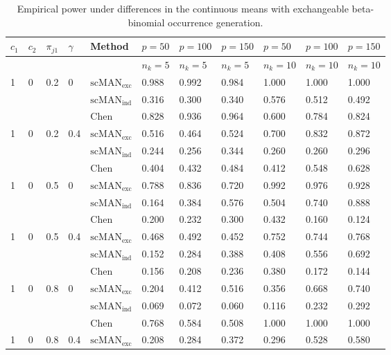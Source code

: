 \begin{table}[H]
\scriptsize
\centering
\caption{Empirical power under differences in the continuous means with exchangeable beta-binomial occurrence generation.}
\label{tab:mean-power-exchangeable}
\begin{tabular}{lllllllllll}
\hline
$c_1$ & $c_2$ & $\pi_{j1}$ & $\gamma$ & Method & $p=50$ & $p=100$ & $p=150$ & $p=50$ & $p=100$ & $p=150$ \\
\hline
& & & & & $n_k=5$ & $n_k=5$ & $n_k=5$ & $n_k=10$ & $n_k=10$ & $n_k=10$ \\
1 & 0 & 0.2 & 0 & $\mathrm{scMAN}_{\mathrm{exc}}$ & 0.988 & 0.992 & 0.984 & 1.000 & 1.000 & 1.000 \\
 &  &  &  & $\mathrm{scMAN}_{\mathrm{ind}}$ & 0.316 & 0.300 & 0.340 & 0.576 & 0.512 & 0.492 \\
 &  &  &  & Chen & 0.828 & 0.936 & 0.964 & 0.600 & 0.784 & 0.824 \\
1 & 0 & 0.2 & 0.4 & $\mathrm{scMAN}_{\mathrm{exc}}$ & 0.516 & 0.464 & 0.524 & 0.700 & 0.832 & 0.872 \\
 &  &  &  & $\mathrm{scMAN}_{\mathrm{ind}}$ & 0.244 & 0.256 & 0.344 & 0.260 & 0.260 & 0.296 \\
 &  &  &  & Chen & 0.404 & 0.432 & 0.484 & 0.412 & 0.548 & 0.628 \\
1 & 0 & 0.5 & 0 & $\mathrm{scMAN}_{\mathrm{exc}}$ & 0.788 & 0.836 & 0.720 & 0.992 & 0.976 & 0.928 \\
 &  &  &  & $\mathrm{scMAN}_{\mathrm{ind}}$ & 0.164 & 0.384 & 0.576 & 0.504 & 0.740 & 0.888 \\
 &  &  &  & Chen & 0.200 & 0.232 & 0.300 & 0.432 & 0.160 & 0.124 \\
1 & 0 & 0.5 & 0.4 & $\mathrm{scMAN}_{\mathrm{exc}}$ & 0.468 & 0.492 & 0.452 & 0.752 & 0.744 & 0.768 \\
 &  &  &  & $\mathrm{scMAN}_{\mathrm{ind}}$ & 0.152 & 0.284 & 0.388 & 0.408 & 0.556 & 0.692 \\
 &  &  &  & Chen & 0.156 & 0.208 & 0.236 & 0.380 & 0.172 & 0.144 \\
1 & 0 & 0.8 & 0 & $\mathrm{scMAN}_{\mathrm{exc}}$ & 0.204 & 0.412 & 0.516 & 0.356 & 0.668 & 0.740 \\
 &  &  &  & $\mathrm{scMAN}_{\mathrm{ind}}$ & 0.069 & 0.072 & 0.060 & 0.116 & 0.232 & 0.292 \\
 &  &  &  & Chen & 0.768 & 0.584 & 0.508 & 1.000 & 1.000 & 1.000 \\
1 & 0 & 0.8 & 0.4 & $\mathrm{scMAN}_{\mathrm{exc}}$ & 0.208 & 0.284 & 0.372 & 0.296 & 0.528 & 0.580 \\

\end{tabular}
\end{table}
